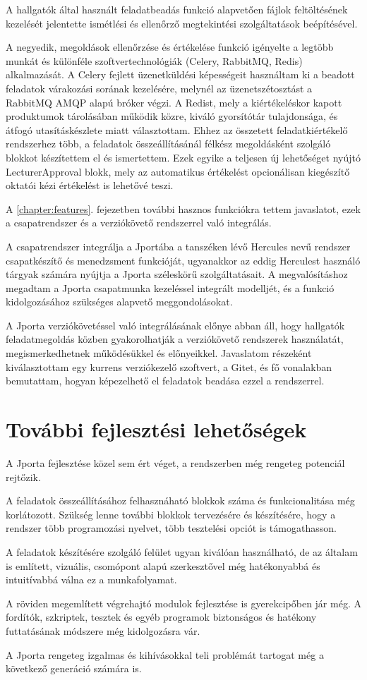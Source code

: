 A hallgatók által használt feladatbeadás funkció alapvetően fájlok feltöltésének kezelését jelentette ismétlési és ellenőrző megtekintési szolgáltatások beépítésével.

A negyedik, megoldások ellenőrzése és értékelése funkció igényelte a legtöbb munkát és különféle szoftvertechnológiák (Celery, RabbitMQ, Redis) alkalmazását.
A Celery fejlett üzenetküldési képességeit használtam ki a beadott feladatok várakozási sorának kezelésére, melynél az üzenetszétosztást a RabbitMQ AMQP alapú bróker végzi.
A Redist, mely a kiértékeléskor kapott produktumok tárolásában működik közre, kiváló gyorsítótár tulajdonsága, és átfogó utasításkészlete miatt választottam.
Ehhez az összetett feladatkiértékelő rendszerhez több, a feladatok összeállításánál félkész megoldásként szolgáló blokkot készítettem el és ismertettem.
Ezek egyike a teljesen új lehetőséget nyújtó LecturerApproval blokk, mely az automatikus értékelést opcionálisan kiegészítő oktatói kézi értékelést is lehetővé teszi.

A \ref{chapter:features}. fejezetben további hasznos funkciókra tettem javaslatot, ezek a csapatrendszer és a verziókövető rendszerrel való integrálás.

A csapatrendszer integrálja a Jportába a tanszéken lévő Hercules nevű rendszer csapatkészítő és menedzsment funkcióját, ugyanakkor az eddig Herculest használó tárgyak számára nyújtja a Jporta széleskörű szolgáltatásait.
A megvalósításhoz megadtam a Jporta csapatmunka kezeléssel integrált modelljét, és a funkció kidolgozásához szükséges alapvető meggondolásokat.

A Jporta verziókövetéssel való integrálásának előnye abban áll, hogy hallgatók feladatmegoldás közben gyakorolhatják a verziókövető rendszerek használatát, megismerkedhetnek működésükkel és előnyeikkel.
Javaslatom részeként kiválasztottam egy kurrens verziókezelő szoftvert, a Gitet, és fő vonalakban bemutattam, hogyan képezelhető el feladatok beadása ezzel a rendszerrel.

\section*{További fejlesztési lehetőségek}
A Jporta fejlesztése közel sem ért véget, a rendszerben még rengeteg potenciál rejtőzik.

A feladatok összeállításához felhasznáható blokkok száma és funkcionalitása még korlátozott.
Szükség lenne további blokkok tervezésére és készítésére, hogy a rendszer több programozási nyelvet, több tesztelési opciót is támogathasson.

A feladatok készítésére szolgáló felület ugyan kiválóan használható, de az általam is említett, vizuális, csomópont alapú szerkesztővel még hatékonyabbá és intuitívabbá válna ez a munkafolyamat.

A röviden megemlített végrehajtó modulok fejlesztése is gyerekcipőben jár még.
A fordítók, szkriptek, tesztek és egyéb programok biztonságos és hatékony futtatásának módszere még kidolgozásra vár.

A Jporta rengeteg izgalmas és kihívásokkal teli problémát tartogat még a következő generáció számára is.